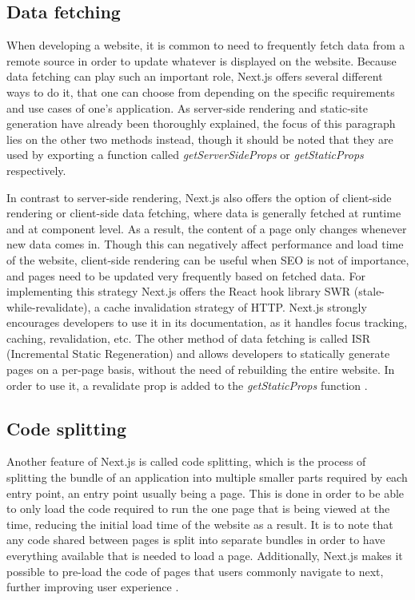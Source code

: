 \subsection{Data fetching}
When developing a website, it is common to need to frequently fetch data from a remote source in order to update whatever is displayed
on the website. Because data fetching can play such an important role, Next.js offers several different ways to do it, that one can choose
from depending on the specific requirements and use cases of one's application. As server-side rendering and static-site generation have already
been thoroughly explained, the focus of this paragraph lies on the other two methods instead, though it should be noted that they are used by
exporting a function called \emph{getServerSideProps} or \emph{getStaticProps} respectively.

In contrast to server-side rendering, Next.js also offers the
option of client-side rendering or client-side data fetching, where data is generally fetched at runtime and at component level. As a
result, the content of a page only changes whenever new data comes in. Though this can negatively affect performance and load time of the
website, client-side rendering can be useful when SEO is not of importance, and pages need to be updated very frequently based on fetched data.
For implementing this strategy Next.js offers the React hook library SWR (stale-while-revalidate), a cache invalidation strategy
of HTTP. Next.js strongly encourages developers to use it in its documentation, as it handles focus tracking, caching, revalidation, etc. The
other method of data fetching is called ISR (Incremental Static Regeneration) and allows developers to statically generate pages on a
per-page basis, without the need of rebuilding the entire website. In order to use it, a revalidate prop is added to the \emph{getStaticProps} function \cite{NextjsDataFetching}.
\\
\subsection{Code splitting}
Another feature of Next.js is called code splitting, which is the process of splitting the bundle of an application into multiple smaller parts
required by each entry point, an entry point usually being a page. This is done in order to be able to only load the code required to run the one
page that is being viewed at the time, reducing the initial load time of the website as a result. It is to note that any code shared between pages
is split into separate bundles in order to have everything available that is needed to load a page. Additionally, Next.js makes it possible to
pre-load the code of pages that users commonly navigate to next, further improving user experience \cite{NextjsCodeSplitting}.
\\
